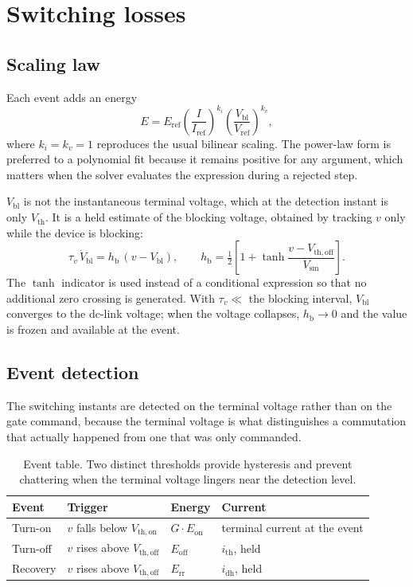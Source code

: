 \documentclass[11pt,a4paper]{article}
\newcommand{\Eon}{E_\mathrm{on}}
\newcommand{\Eoff}{E_\mathrm{off}}
\newcommand{\Err}{E_\mathrm{rr}}
\begin{document}
\section{Switching losses}\label{sec:switching}

\subsection{Scaling law}

Each event adds an energy
\begin{equation}
  E = E_\mathrm{ref}
      \left(\frac{I}{I_\mathrm{ref}}\right)^{k_i}
      \left(\frac{V_\mathrm{bl}}{V_\mathrm{ref}}\right)^{k_v},
  \label{eq:scaling}
\end{equation}
where $k_i = k_v = 1$ reproduces the usual bilinear scaling. The power-law form
is preferred to a polynomial fit because it remains positive for any argument,
which matters when the solver evaluates the expression during a rejected step.

$V_\mathrm{bl}$ is not the instantaneous terminal voltage, which at the
detection instant is only $V_\mathrm{th}$. It is a held estimate of the blocking
voltage, obtained by tracking $v$ only while the device is blocking:
\begin{equation}
  \tau_v\,\dot V_\mathrm{bl} = h_\mathrm{b}\,(v - V_\mathrm{bl}),
  \qquad
  h_\mathrm{b} = \tfrac{1}{2}\left[1 + \tanh\frac{v - V_\mathrm{th,off}}{V_\mathrm{sm}}\right].
\end{equation}
The $\tanh$ indicator is used instead of a conditional expression so that no
additional zero crossing is generated. With $\tau_v \ll$ the blocking interval,
$V_\mathrm{bl}$ converges to the dc-link voltage; when the voltage collapses,
$h_\mathrm{b} \to 0$ and the value is frozen and available at the event.

\subsection{Event detection}

The switching instants are detected on the terminal voltage rather than on the
gate command, because the terminal voltage is what distinguishes a commutation
that actually happened from one that was only commanded.

\begin{table}[h]
\centering
\begin{tabular}{lllp{45mm}}
\toprule
Event & Trigger & Energy & Current \\
\midrule
Turn-on   & $v$ falls below $V_\mathrm{th,on}$  & $G\cdot\Eon$ & terminal current at the event \\
Turn-off  & $v$ rises above $V_\mathrm{th,off}$ & $\Eoff$      & $i_\mathrm{th}$, held \\
Recovery  & $v$ rises above $V_\mathrm{th,off}$ & $\Err$       & $i_\mathrm{dh}$, held \\
\bottomrule
\end{tabular}
\caption{Event table. Two distinct thresholds provide hysteresis and prevent
chattering when the terminal voltage lingers near the detection level.}
\end{table}
\end{document}
